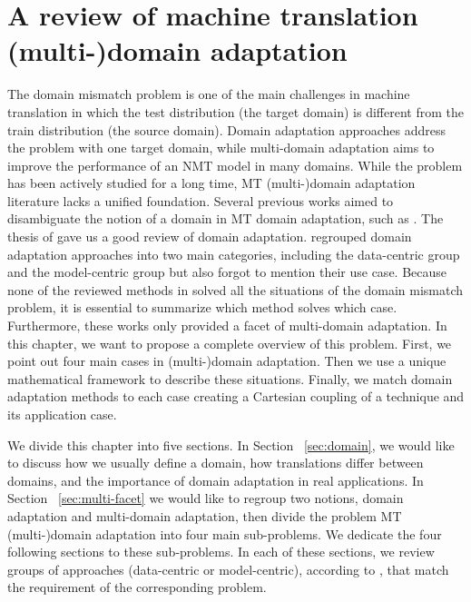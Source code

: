 \chapter{A review of machine translation (multi-)domain adaptation} \label{chap:mdmt-review}
The domain mismatch problem is one of the main challenges in machine translation \citep{koehn17six} in which the test distribution (the target domain) is different from the train distribution (the source domain). Domain adaptation approaches address the problem with one target domain, while multi-domain adaptation aims to improve the performance of an NMT model in many domains. While the problem has been actively studied for a long time, MT (multi-)domain adaptation literature lacks a unified foundation. Several previous works aimed to disambiguate the notion of a domain in MT domain adaptation, such as \cite{Wees15Whats,Wees17Whats,Saunders21Domain}. The thesis of \cite{Saunders21Domain} gave us a good review of domain adaptation. \citet{Chu18asurvey} regrouped domain adaptation approaches into two main categories, including the data-centric group and the model-centric group but also forgot to mention their use case. Because none of the reviewed methods in \citet{Chu18asurvey} solved all the situations of the domain mismatch problem, it is essential to summarize which method solves which case. Furthermore, these works only provided a facet of multi-domain adaptation. In this chapter, we want to propose a complete overview of this problem. First, we point out four main cases in (multi-)domain adaptation. Then we use a unique mathematical framework to describe these situations. Finally, we match domain adaptation methods to each case creating a Cartesian coupling of a technique and its application case.

We divide this chapter into five sections. In Section ~\ref{sec:domain}, we would like to discuss how we usually define a domain, how translations differ between domains, and the importance of domain adaptation in real applications. In Section ~\ref{sec:multi-facet} we would like to regroup two notions, domain adaptation and multi-domain adaptation, then divide the problem MT (multi-)domain adaptation into four main sub-problems. We dedicate the four following sections to these sub-problems. In each of these sections, we review groups of approaches (data-centric or model-centric), according to \citet{Chu18survey}, that match the requirement of the corresponding problem.

